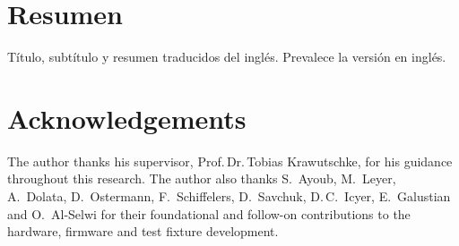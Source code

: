 \documentclass[12pt,ngerman,english,openany]{book}
\makeatletter
\newcommand{\translatedTitle}[2]{%
	{\setlength{\parindent}{0pt}\raggedright
	{\large\bfseries \par}
	\smallskip
	{\itshape \/\par}
	\medskip
	{\small #2\par}
	\bigskip}%
	\@afterindentfalse\@afterheading}
\makeatother
\begin{document}
\pagestyle{plain}
\chapter*{Resumen}
\translatedTitle{es}{Título, subtítulo y resumen traducidos del inglés. Prevalece la versión en inglés.}

\clearpage
{}

\pagestyle{plain}
\chapter*{Acknowledgements}
The author thanks his supervisor, Prof.\,Dr.\,Tobias Krawutschke, for his guidance throughout this research. The author also thanks S.~Ayoub, M.~Leyer, A.~Dolata, D.~Ostermann, F.~Schiffelers, D.~Savchuk, D.\,C.~Icyer, E.~Galustian and O.~Al-Selwi for their foundational and follow-on contributions to the hardware, firmware and test fixture development.
\clearpage

\pagestyle{fancy}
\tableofcontents
\clearpage
\listoffigures
\clearpage
\listoftables
\clearpage
\printglossary[type=\acronymtype, title=List of Abbreviations]
\clearpage

\mainmatter
\pagestyle{fancy}
\glsresetall








\clearpage

\appendix
{}
\pagestyle{fancy}





\clearpage

\backmatter
\pagestyle{fancy}

{\raggedright\printbibliography[title=References, heading=bibintoc]\par}
\clearpage
\end{document}
